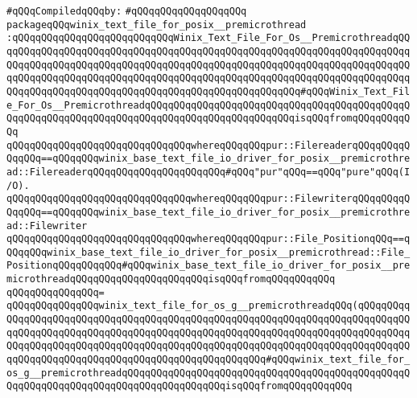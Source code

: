 \newline
\verb|#qQQqCompiledqQQqby:|\newline
\verb|#qQQqqQQqqQQqqQQqqQQq|\newline
\newline
\verb|packageqQQqwinix_text_file_for_posix__premicrothread|\newline
\verb|:qQQqqQQqqQQqqQQqqQQqqQQqqQQqWinix_Text_File_For_Os__PremicrothreadqQQqqQQqqQQqqQQqqQQqqQQqqQQqqQQqqQQqqQQqqQQqqQQqqQQqqQQqqQQqqQQqqQQqqQQqqQQqqQQqqQQqqQQqqQQqqQQqqQQqqQQqqQQqqQQqqQQqqQQqqQQqqQQqqQQqqQQqqQQqqQQqqQQqqQQqqQQqqQQqqQQqqQQqqQQqqQQqqQQqqQQqqQQqqQQqqQQqqQQqqQQqqQQqqQQqqQQqqQQqqQQqqQQqqQQqqQQqqQQqqQQqqQQqqQQqqQQqqQQqqQQq#qQQqWinix_Text_File_For_Os__PremicrothreadqQQqqQQqqQQqqQQqqQQqqQQqqQQqqQQqqQQqqQQqqQQqqQQqqQQqqQQqqQQqqQQqqQQqqQQqqQQqqQQqqQQqqQQqqQQqqQQqisqQQqfromqQQqqQQqqQQq|\newline
\verb|qQQqqQQqqQQqqQQqqQQqqQQqqQQqqQQqwhereqQQqqQQqpur::FilereaderqQQqqQQqqQQqqQQq==qQQqqQQqwinix_base_text_file_io_driver_for_posix__premicrothread::FilereaderqQQqqQQqqQQqqQQqqQQqqQQq#qQQq"pur"qQQq==qQQq"pure"qQQq(I/O).|\newline
\verb|qQQqqQQqqQQqqQQqqQQqqQQqqQQqqQQqwhereqQQqqQQqpur::FilewriterqQQqqQQqqQQqqQQq==qQQqqQQqwinix_base_text_file_io_driver_for_posix__premicrothread::Filewriter|\newline
\verb|qQQqqQQqqQQqqQQqqQQqqQQqqQQqqQQqwhereqQQqqQQqpur::File_PositionqQQq==qQQqqQQqwinix_base_text_file_io_driver_for_posix__premicrothread::File_PositionqQQqqQQqqQQq#qQQqwinix_base_text_file_io_driver_for_posix__premicrothreadqQQqqQQqqQQqqQQqqQQqqQQqisqQQqfromqQQqqQQqqQQq|\newline
\verb|qQQqqQQqqQQqqQQq=|\newline
\verb|qQQqqQQqqQQqqQQqwinix_text_file_for_os_g__premicrothreadqQQq(qQQqqQQqqQQqqQQqqQQqqQQqqQQqqQQqqQQqqQQqqQQqqQQqqQQqqQQqqQQqqQQqqQQqqQQqqQQqqQQqqQQqqQQqqQQqqQQqqQQqqQQqqQQqqQQqqQQqqQQqqQQqqQQqqQQqqQQqqQQqqQQqqQQqqQQqqQQqqQQqqQQqqQQqqQQqqQQqqQQqqQQqqQQqqQQqqQQqqQQqqQQqqQQqqQQqqQQqqQQqqQQqqQQqqQQqqQQqqQQqqQQqqQQqqQQqqQQqqQQqqQQq#qQQqwinix_text_file_for_os_g__premicrothreadqQQqqQQqqQQqqQQqqQQqqQQqqQQqqQQqqQQqqQQqqQQqqQQqqQQqqQQqqQQqqQQqqQQqqQQqqQQqqQQqqQQqqQQqisqQQqfromqQQqqQQqqQQq|\newline
